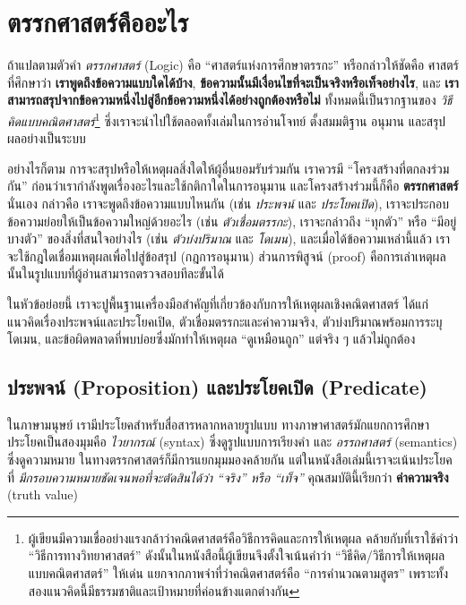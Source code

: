 \section{ตรรกศาสตร์คืออะไร}

ถ้าแปลตามตัวคำ \emph{ตรรกศาสตร์} (Logic) คือ “ศาสตร์แห่งการศึกษาตรรกะ” หรือกล่าวให้ชัดคือ ศาสตร์ที่ศึกษาว่า
\textbf{เราพูดถึงข้อความแบบใดได้บ้าง}, \textbf{ข้อความนั้นมีเงื่อนไขที่จะเป็นจริงหรือเท็จอย่างไร}, และ \textbf{เราสามารถสรุปจากข้อความหนึ่งไปสู่อีกข้อความหนึ่งได้อย่างถูกต้องหรือไม่}
ทั้งหมดนี้เป็นรากฐานของ \emph{วิธีคิดแบบคณิตศาสตร์}\footnote{ผู้เขียนมีความเชื่ออย่างแรงกล้าว่าคณิตศาสตร์คือวิธีการคิดและการให้เหตุผล คล้ายกับที่เราใช้คำว่า “วิธีการทางวิทยาศาสตร์”
	ดังนั้นในหนังสือนี้ผู้เขียนจึงตั้งใจเน้นคำว่า “วิธีคิด/วิธีการให้เหตุผลแบบคณิตศาสตร์” ให้เด่น แยกจากภาพจำที่ว่าคณิตศาสตร์คือ “การคำนวณตามสูตร” เพราะทั้งสองแนวคิดนี้มีธรรมชาติและเป้าหมายที่ค่อนข้างแตกต่างกัน}
ซึ่งเราจะนำไปใช้ตลอดทั้งเล่มในการอ่านโจทย์ ตั้งสมมติฐาน อนุมาน และสรุปผลอย่างเป็นระบบ

อย่างไรก็ตาม การจะสรุปหรือให้เหตุผลสิ่งใดให้ผู้อื่นยอมรับร่วมกัน เราควรมี “โครงสร้างที่ตกลงร่วมกัน” ก่อนว่าเรากำลังพูดเรื่องอะไรและใช้กติกาใดในการอนุมาน
และโครงสร้างร่วมนี้ก็คือ \textbf{ตรรกศาสตร์} นั่นเอง
กล่าวคือ เราจะพูดถึงข้อความแบบไหนกัน (เช่น \emph{ประพจน์} และ \emph{ประโยคเปิด}),
เราจะประกอบข้อความย่อยให้เป็นข้อความใหญ่ด้วยอะไร (เช่น \emph{ตัวเชื่อมตรรกะ}),
เราจะกล่าวถึง “ทุกตัว” หรือ “มีอยู่บางตัว” ของสิ่งที่สนใจอย่างไร (เช่น \emph{ตัวบ่งปริมาณ} และ \emph{โดเมน}),
และเมื่อได้ข้อความเหล่านี้แล้ว เราจะใช้กฎใดเชื่อมเหตุผลเพื่อไปสู่ข้อสรุป (กฎการอนุมาน)
ส่วนการพิสูจน์ (proof) คือการเล่าเหตุผลนั้นในรูปแบบที่ผู้อ่านสามารถตรวจสอบทีละขั้นได้

ในหัวข้อย่อยนี้ เราจะปูพื้นฐานเครื่องมือสำคัญที่เกี่ยวข้องกับการให้เหตุผลเชิงคณิตศาสตร์ ได้แก่
แนวคิดเรื่องประพจน์และประโยคเปิด, ตัวเชื่อมตรรกะและค่าความจริง, ตัวบ่งปริมาณพร้อมการระบุโดเมน,
และข้อผิดพลาดที่พบบ่อยซึ่งมักทำให้เหตุผล “ดูเหมือนถูก” แต่จริง ๆ แล้วไม่ถูกต้อง

\subsection{ประพจน์ (Proposition) และประโยคเปิด (Predicate)}
ในภาษามนุษย์ เรามีประโยคสำหรับสื่อสารหลากหลายรูปแบบ
ทางภาษาศาสตร์มักแยกการศึกษาประโยคเป็นสองมุมคือ
\emph{ไวยากรณ์} (syntax) ซึ่งดูรูปแบบการเรียงคำ
และ \emph{อรรถศาสตร์} (semantics) ซึ่งดูความหมาย
ในทางตรรกศาสตร์ก็มีการแยกมุมมองคล้ายกัน แต่ในหนังสือเล่มนี้เราจะเน้นประโยคที่ \emph{มีกรอบความหมายชัดเจนพอที่จะตัดสินได้ว่า ``จริง'' หรือ ``เท็จ''}
คุณสมบัตินี้เรียกว่า \textbf{ค่าความจริง} (truth value)


